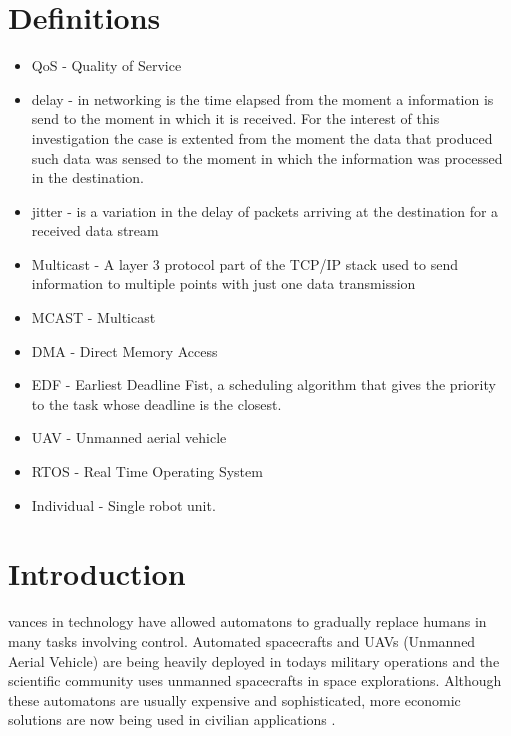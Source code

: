 \documentclass[journal]{IEEEtran}
\begin{document}
\section{Definitions}
\begin{itemize}
\item QoS - Quality of Service
\item delay - in networking is the time elapsed from the moment a information is send to the moment in which it is received. For the interest of this investigation the case is extented from the moment the data that produced such data was sensed to the moment in which the information was processed in the destination.
\item jitter - is a variation in the delay of packets arriving at the destination for a received data stream
\item Multicast - A layer 3 protocol part of the TCP/IP stack used to send information to multiple points with just one data transmission
\item MCAST - Multicast
\item DMA - Direct Memory Access
\item EDF - Earliest Deadline Fist, a scheduling algorithm that gives the priority to the task whose deadline is the closest.
\item UAV - Unmanned aerial vehicle
\item RTOS - Real Time Operating System
\item Individual - Single robot unit.
\end{itemize}

\section{Introduction}
vances in technology have allowed automatons to gradually replace humans in many tasks involving control. Automated spacecrafts and UAVs (Unmanned Aerial Vehicle) are being heavily deployed in todays military operations and the scientific
community uses unmanned spacecrafts in space explorations. Although these automatons are usually expensive and sophisticated, more economic solutions are now being used in civilian applications \cite{YS1}.
\end{document}
